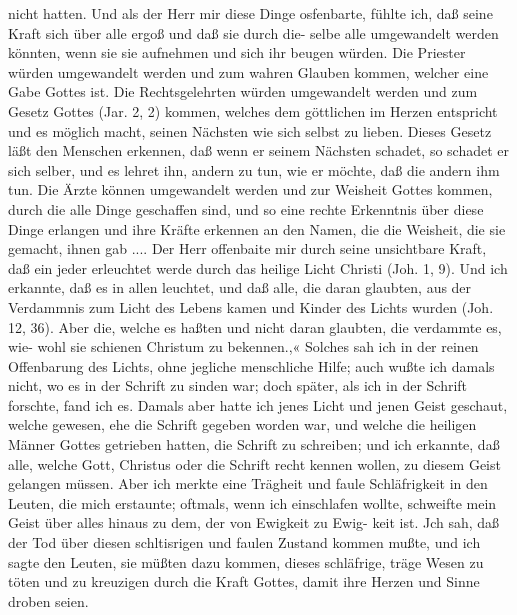 nicht hatten. Und als der Herr mir diese Dinge osfenbarte, fühlte
ich, daß seine Kraft sich über alle ergoß und daß sie durch die-
selbe alle umgewandelt werden könnten, wenn sie sie aufnehmen und
sich ihr beugen würden. Die Priester würden umgewandelt werden
und zum wahren Glauben kommen, welcher eine Gabe Gottes
ist. Die Rechtsgelehrten würden umgewandelt werden und zum
Gesetz Gottes (Jar. 2, 2) kommen, welches dem göttlichen im
Herzen entspricht und es möglich macht, seinen Nächsten wie sich
selbst zu lieben. Dieses Gesetz läßt den Menschen erkennen, daß
wenn er seinem Nächsten schadet, so schadet er sich selber, und
es lehret ihn, andern zu tun, wie er möchte, daß die andern ihm
tun. Die Ärzte können umgewandelt werden und zur Weisheit
Gottes kommen, durch die alle Dinge geschaffen sind, und so
eine rechte Erkenntnis über diese Dinge erlangen und ihre Kräfte
erkennen an den Namen, die die Weisheit, die sie gemacht, ihnen
gab ....
Der Herr offenbaite mir durch seine unsichtbare Kraft, daß
ein jeder erleuchtet werde durch das heilige Licht Christi (Joh. 1, 9).
Und ich erkannte, daß es in allen leuchtet, und daß alle, die
daran glaubten, aus der Verdammnis zum Licht des Lebens
kamen und Kinder des Lichts wurden (Joh. 12, 36). Aber die,
welche es haßten und nicht daran glaubten, die verdammte es, wie-
wohl sie schienen Christum zu bekennen.,« Solches sah ich in der
reinen Offenbarung des Lichts, ohne jegliche menschliche Hilfe;
auch wußte ich damals nicht, wo es in der Schrift zu sinden
war; doch später, als ich in der Schrift forschte, fand ich es.
Damals aber hatte ich jenes Licht und jenen Geist geschaut, welche
gewesen, ehe die Schrift gegeben worden war, und welche die
heiligen Männer Gottes getrieben hatten, die Schrift zu schreiben;
und ich erkannte, daß alle, welche Gott, Christus oder die Schrift
recht kennen wollen, zu diesem Geist gelangen müssen. Aber ich
merkte eine Trägheit und faule Schläfrigkeit in den Leuten, die
mich erstaunte; oftmals, wenn ich einschlafen wollte, schweifte
mein Geist über alles hinaus zu dem, der von Ewigkeit zu Ewig-
keit ist. Jch sah, daß der Tod über diesen schltisrigen und faulen
Zustand kommen mußte, und ich sagte den Leuten, sie müßten
dazu kommen, dieses schläfrige, träge Wesen zu töten und zu
kreuzigen durch die Kraft Gottes, damit ihre Herzen und Sinne
droben seien.


